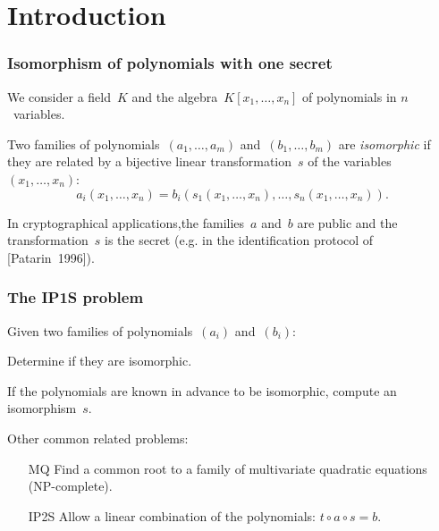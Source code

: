 \documentclass{beamer}%
\def\emphz#1{\emph{{\color{bleu}#1}}}
\begin{document}
\section{Introduction}
\begin{frame}\frametitle{Isomorphism of polynomials with one secret} %

We consider a field~$K$ and the algebra~$K[x_1,…,x_n]$ of polynomials in
$n$~variables.

\begin{definition}
Two families of polynomials~$(a_1, …, a_m)$ and~$(b_1, …, b_m)$
are \emphz{isomorphic} if they are related by a
bijective linear transformation~$s$ of the variables~$(x_1, …, x_n)$:
\[ a_i (x_1, …, x_n) = b_i (s_1 (x_1, …, x_n), …, s_n (x_1, …, x_n)). \]
\end{definition}

In cryptographical applications,the families~$a$ and~$b$ are public and the
transformation~$s$ is the secret (e.g. in the identification protocol of
{\color{rouge}[Patarin~1996]}).
\end{frame}%
\begin{frame}\frametitle{The IP1S problem}%

\begin{df}
Given two families of polynomials~$(a_i)$ and~$(b_i)$:
\begin{description}[labelwidth=1ex,align=parleft]
\item[Decisional IP1S] Determine if they are isomorphic.
\item[\textbf{Computational IP1S}] If the polynomials are known in
advance to be isomorphic, compute an isomorphism~$s$.
\end{description}
\end{df}

\bigskip
Other common related problems:
\begin{itemize}
\item[MQ] Find a common root to a family of multivariate quadratic
equations (NP-complete).
\item[IP2S] Allow a linear combination of the polynomials: $t ∘ a ∘ s =
b$.
\end{itemize}
\end{frame}%
\end{document}
